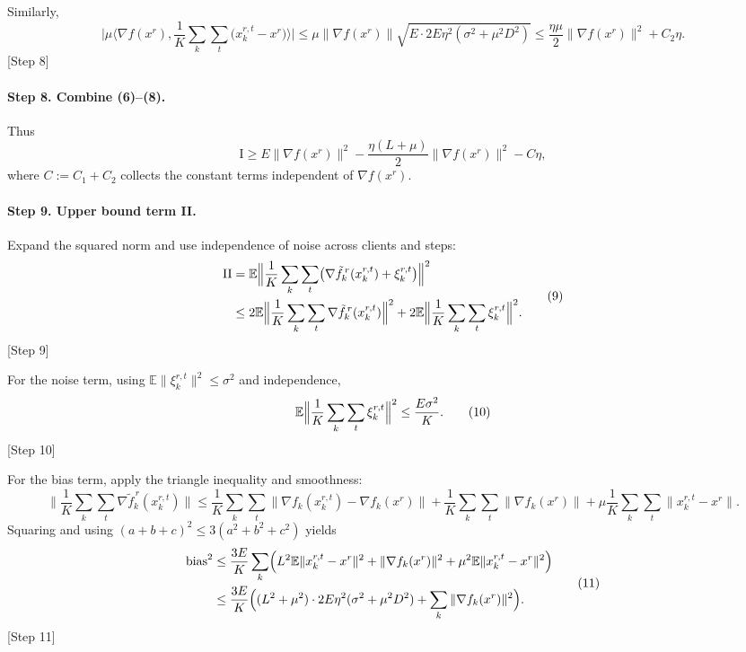 \documentclass{article}
\newcommand{\E}{\mathbb{E}}
\begin{document}
Similarly,
\[
\Big|\mu\Big\langle\nabla f(x^{r}),\frac{1}{K}\sum_{k}\sum_{t}\bigl(x_{k}^{r,t}-x^{r}\bigr)\Big\rangle\Big|
\le \mu\|\nabla f(x^{r})\|\sqrt{E\cdot 2E\eta^{2}(\sigma^{2}+\mu^{2}D^{2})}
\le \frac{\eta\mu}{2}\|\nabla f(x^{r})\|^{2}+C_{2}\eta .
\tag{8}
\]
[Step 8]

\paragraph{Step 8. Combine (6)–(8).}
Thus
\[
\text{I}\ge E\|\nabla f(x^{r})\|^{2}
-\frac{\eta(L+\mu)}{2}\|\nabla f(x^{r})\|^{2}
- C\eta,
\]
where $C:=C_{1}+C_{2}$ collects the constant terms independent of $\nabla f(x^{r})$.

\paragraph{Step 9. Upper bound term II.}
Expand the squared norm and use independence of noise across clients and steps:
\[
\begin{aligned}
\text{II}
&= \E\Bigl\|\frac{1}{K}\sum_{k}\sum_{t}\bigl(\nabla \tilde f_{k}^{\,r}(x_{k}^{r,t})+\xi_{k}^{r,t}\bigr)\Bigr\|^{2}\\
&\le 2\E\Bigl\|\frac{1}{K}\sum_{k}\sum_{t}\nabla \tilde f_{k}^{\,r}(x_{k}^{r,t})\Bigr\|^{2}
   +2\E\Bigl\|\frac{1}{K}\sum_{k}\sum_{t}\xi_{k}^{r,t}\Bigr\|^{2}.
\end{aligned}
\tag{9}
\]
[Step 9]

For the noise term, using $\E\|\xi_{k}^{r,t}\|^{2}\le\sigma^{2}$ and independence,
\[
\E\Bigl\|\frac{1}{K}\sum_{k}\sum_{t}\xi_{k}^{r,t}\Bigr\|^{2}
\le \frac{E\sigma^{2}}{K}. \tag{10}
\]
[Step 10]

For the bias term, apply the triangle inequality and smoothness:
\[
\Big\|\frac{1}{K}\sum_{k}\sum_{t}\nabla \tilde f_{k}^{\,r}(x_{k}^{r,t})\Big\|
\le
\frac{1}{K}\sum_{k}\sum_{t}\bigl\|\nabla f_k(x_{k}^{r,t})-\nabla f_k(x^{r})\bigr\|
+\frac{1}{K}\sum_{k}\sum_{t}\|\nabla f_k(x^{r})\|
+\mu\frac{1}{K}\sum_{k}\sum_{t}\|x_{k}^{r,t}-x^{r}\|.
\]
Squaring and using $(a+b+c)^{2}\le3(a^{2}+b^{2}+c^{2})$ yields
\[
\begin{aligned}
\text{bias}^{2}
&\le
\frac{3E}{K}\sum_{k}\Bigl(L^{2}\E\|x_{k}^{r,t}-x^{r}\|^{2}
      +\|\nabla f_k(x^{r})\|^{2}
      +\mu^{2}\E\|x_{k}^{r,t}-x^{r}\|^{2}\Bigr)\\
&\le
\frac{3E}{K}\Bigl((L^{2}+\mu^{2})\cdot 2E\eta^{2}(\sigma^{2}+\mu^{2}D^{2})
      +\sum_{k}\|\nabla f_k(x^{r})\|^{2}\Bigr).
\end{aligned}
\tag{11}
\]
[Step 11]
\end{document}
